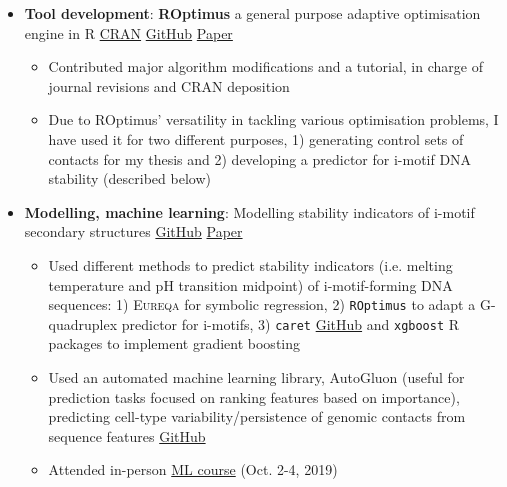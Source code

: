 \documentclass{article}
\newcommand{\resumeItem}[2]{
  \item\small{
    \textbf{#1}{: #2 \vspace{-2pt}}
  }
}
\newcommand{\resumeItemListStart}{\begin{itemize}}
\newcommand{\resumeItemListEnd}{\end{itemize}\vspace{-5pt}}
\begin{document}
            \resumeItemListStart
                \resumeItem{Tool development}{\textbf{ROptimus} a general purpose adaptive optimisation engine in R \href{https://cran.r-project.org/web/packages/ROptimus/index.html}{CRAN} \href{https://github.com/SahakyanLab/ROptimus}{GitHub} \href{https://academic.oup.com/bioinformatics/article/39/5/btad292/7152277}{Paper}}
                    \begin{itemize}
                        \item {Contributed major algorithm modifications and a tutorial, in charge of journal revisions and CRAN deposition}
                        \item {Due to ROptimus' versatility in tackling various optimisation problems, I have used it for two different purposes, 1) generating control sets of contacts for my thesis and 2) developing a predictor for i-motif DNA stability (described below)}
                    \end{itemize}
            \resumeItemListEnd
            
            \resumeItemListStart
                \resumeItem{Modelling, machine learning}{Modelling stability indicators of i-motif secondary structures \href{https://github.com/SahakyanLab/iMotif_dev}{GitHub} \href{https://doi.org/10.1002/anie.202016801}{Paper}}
                    \begin{itemize}
                        \item {Used different methods to predict stability indicators (i.e. melting temperature and pH transition midpoint) of i-motif-forming DNA sequences: 1) \textsc{Eureqa} for symbolic regression, 2) \texttt{ROptimus} to adapt a G-quadruplex predictor for i-motifs, 3) \texttt{caret} \href{https://github.com/liezeltamon/ml-lib}{GitHub} and \texttt{xgboost} R packages to implement gradient boosting}
                        \item {Used an automated machine learning library, AutoGluon (useful for prediction tasks focused on ranking features based on importance), predicting cell-type variability/persistence of genomic contacts from sequence features \href{https://github.com/liezeltamon/predicting-contact-variability/tree/main}{GitHub}}
                        \item {Attended in-person \href{https://training.cam.ac.uk/course/bioinfo-ml}{ML course} (Oct. 2-4, 
                        2019)}
                    \end{itemize}
            \resumeItemListEnd
            
\end{document}
